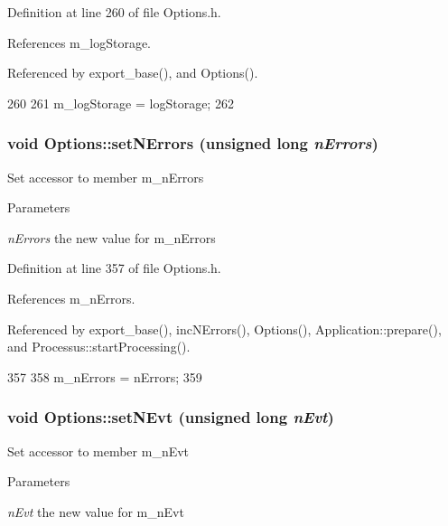 Definition at line 260 of file Options.h.

References m\_\-logStorage.

Referenced by export\_\-base(), and Options().


\begin{DoxyCode}
260                                              {
261                 m_logStorage = logStorage;
262         }
\end{DoxyCode}
\hypertarget{classOptions_a45368b495036869c67fe0e6bf9abc4e6}{
\subsubsection[{setNErrors}]{\setlength{\rightskip}{0pt plus 5cm}void Options::setNErrors (unsigned long {\em nErrors})}}
\label{classOptions_a45368b495036869c67fe0e6bf9abc4e6}
Set accessor to member m\_\-nErrors 
\begin{DoxyParams}{Parameters}
\item[{\em nErrors}]the new value for m\_\-nErrors \end{DoxyParams}


Definition at line 357 of file Options.h.

References m\_\-nErrors.

Referenced by export\_\-base(), incNErrors(), Options(), Application::prepare(), and Processus::startProcessing().


\begin{DoxyCode}
357                                                 {
358                 m_nErrors = nErrors;
359         }
\end{DoxyCode}
\hypertarget{classOptions_ae6a0fdaa736948f5040deb3eb6889268}{
\subsubsection[{setNEvt}]{\setlength{\rightskip}{0pt plus 5cm}void Options::setNEvt (unsigned long {\em nEvt})}}
\label{classOptions_ae6a0fdaa736948f5040deb3eb6889268}
Set accessor to member m\_\-nEvt 
\begin{DoxyParams}{Parameters}
\item[{\em nEvt}]the new value for m\_\-nEvt \end{DoxyParams}


